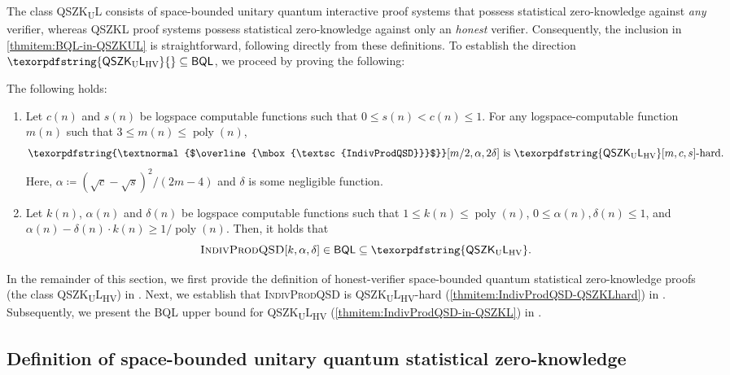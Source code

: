 \documentclass[10pt,a4paper]{article}
\numberwithin{equation}{section}
\numberwithin{figure}{section}
\newcommand{\QSZKL}{\textnormal{\textsf{QSZKL}}\xspace}
\newcommand{\QSZKUL}{\texorpdfstring{\textnormal{\textsf{QSZK}\textsubscript{\textnormal{U}}\textsf{L}}}\xspace}
\newcommand{\QSZKULHV}{\texorpdfstring{\textnormal{\textsf{QSZK}\textsubscript{\textnormal{U}}\textsf{L}}\textsubscript{\textnormal{HV}}}\xspace}
\newcommand{\BQL}{\textnormal{\textsf{BQL}}\xspace}
\newcommand{\textoverline}[1]{$\overline{\mbox{#1}}$}
\newcommand{\IndivProdQSD}{\textnormal{\textsc{IndivProdQSD}}\xspace}
\newcommand{\coIndivProdQSD}{\texorpdfstring{\textnormal{\textoverline{\textsc{IndivProdQSD}}}}\xspace}
\DeclareMathOperator\poly{poly}
\begin{document}
The class \QSZKUL{} consists of space-bounded unitary quantum interactive proof systems that possess statistical zero-knowledge against \textit{any} verifier, whereas \QSZKL{} proof systems possess statistical zero-knowledge against only an \textit{honest} verifier. 
Consequently, the inclusion in \ref{thmitem:BQL-in-QSZKUL} is straightforward, following directly from these definitions. 
To establish the direction $\QSZKULHV{} \subseteq \BQL{}$, we proceed by proving the following: 

\begin{theorem}[\IndivProdQSD{} is \QSZKULHV{}-complete]
    \label{thm:IndivProdQSD-QSZKLcomplete}
    The following holds: 
    \begin{enumerate}[label={\upshape(\arabic*)}, itemsep=0.33em, topsep=0.33em, parsep=0.33em]
        \item Let $c(n)$ and $s(n)$ be logspace computable functions such that $0 \leq s(n) < c(n) \leq 1$. For any logspace-computable function $m(n)$ such that $3 \leq m(n) \leq \poly(n)$, \label{thmitem:IndivProdQSD-QSZKLhard}
        \[ \coIndivProdQSD[m/2,\alpha,2\delta] \text{ is } \QSZKULHV[m,c,s]\text{-hard}.\]
        Here, $\alpha \coloneqq (\sqrt{c}-\sqrt{s})^2/(2m-4)$ and $\delta$ is some negligible function. 
        \item  Let $k(n)$, $\alpha(n)$ and $\delta(n)$ be logspace computable functions such that $1 \leq k(n) \leq \poly(n)$, $0 \leq \alpha(n),\delta(n) \leq 1$, and $\alpha(n) - \delta(n) \cdot k(n) \geq 1/\poly(n)$. Then, it holds that
        \label{thmitem:IndivProdQSD-in-QSZKL}
        \[ \IndivProdQSD[k,\alpha,\delta] \in \BQL \subseteq \QSZKULHV. \]
    \end{enumerate}
\end{theorem}

\vspace{1em}
In the remainder of this section, we first provide the definition of honest-verifier space-bounded quantum statistical zero-knowledge proofs (the class \QSZKULHV{}) in . Next, we establish that \IndivProdQSD{} is \QSZKULHV{}-hard (\ref{thmitem:IndivProdQSD-QSZKLhard}) in . Subsequently, we present the \BQL{} upper bound for \QSZKULHV{} (\ref{thmitem:IndivProdQSD-in-QSZKL}) in . 

\subsection{Definition of space-bounded unitary quantum statistical zero-knowledge}
\label{subsec:QSZKL-definition}
\end{document}
